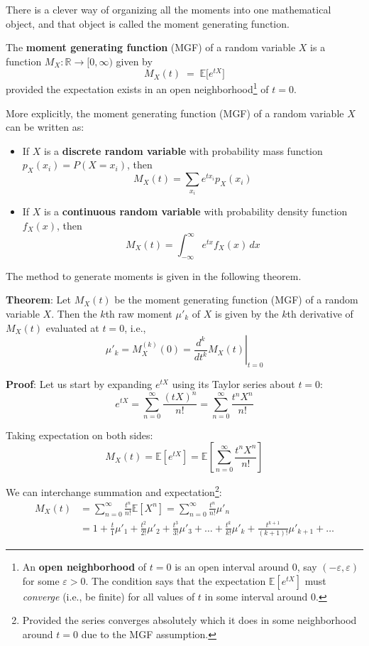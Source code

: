 \documentclass[twoside]{book}
\begin{document}
There is a
clever way of organizing all the moments into one
mathematical object, and that object is called the
moment generating function.
\begin{textbox}
The \textbf{moment generating function} (MGF) of a random variable $X$ is a function $M_X:\mathbb{R} \to [0, \infty)$ given by
    \[
      M_X(t) \;=\; \mathbb{E}\bigl[e^{tX}\bigr]
    \]
provided the expectation exists in an open neighborhood\footnote{An \textbf{open neighborhood} of \( t = 0 \) is an open interval around 0, say \( (-\varepsilon, \varepsilon) \) for some \( \varepsilon > 0 \). The condition says that the expectation \( \mathbb{E}[e^{tX}] \) must \emph{converge} (i.e., be finite) for all values of \( t \) in some interval around 0.} of $t=0$.
\end{textbox}

More explicitly, the moment generating function (MGF) of a random variable \(X\) can be written as:

\begin{itemize}
    \item If \(X\) is a \textbf{discrete random variable} with probability mass function \(p_X(x_i)=P(X=x_i)\), then
    \[
    M_X(t) = \sum_{x_i} e^{tx_i} p_X(x_i)
    \]
    \item If \(X\) is a \textbf{continuous random variable} with probability density function \(f_X(x)\), then
    \[
    M_X(t) = \int_{-\infty}^{\infty} e^{tx} f_X(x) \, dx
    \]
\end{itemize}

The method to generate moments is given in the following theorem.

\begin{textbox}
\textbf{Theorem}: Let \( M_X(t) \) be the moment generating function (MGF) of a random variable \( X \). Then the \( k \)th raw moment \( \mu'_k \) of \( X \) is given by the \( k \)th derivative of \( M_X(t) \) evaluated at \( t = 0 \), i.e.,
\[
\mu'_k = M_X^{(k)}(0) = \left. \frac{d^k}{dt^k} M_X(t) \right|_{t=0}
\]
\end{textbox}

\textbf{Proof}: Let us start by expanding \( e^{tX} \) using its Taylor series about \( t = 0 \):
\[
e^{tX} = \sum_{n=0}^{\infty} \frac{(tX)^n}{n!} = \sum_{n=0}^{\infty} \frac{t^n X^n}{n!}
\]

Taking expectation on both sides:
\[
M_X(t) = \mathbb{E}[e^{tX}] = \mathbb{E} \left[ \sum_{n=0}^{\infty} \frac{t^n X^n}{n!} \right]
\]

We can interchange summation and expectation\footnote{Provided the series converges absolutely which it does in some neighborhood around \( t = 0 \) due to the MGF assumption.}:
\begin{align*}
    M_X(t) &= \sum_{n=0}^{\infty} \frac{t^n}{n!} \mathbb{E}[X^n] = \sum_{n=0}^{\infty} \frac{t^n}{n!} \mu'_n\\
&=1+ \frac{t}{1}\mu'_1 + \frac{t^2}{2!}\mu'_2+ \frac{t^3}{3!}\mu'_3 + \dots + \frac{t^k}{k!}\mu'_k +\frac{t^{k+1}}{(k+1)!}\mu'_{k+1} + \dots 
\end{align*}
\end{document}
